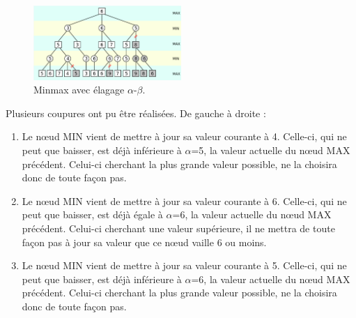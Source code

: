 \begin{figure}[h]
    \begin{center}
        \includegraphics[width=0.5\textwidth]{root/minmax_alpha_beta.png}
    \end{center}
    \caption{Minmax avec élagage $\alpha$-$\beta$.}\label{fig:min_max_alpha_beta}
\end{figure}


Plusieurs coupures ont pu être réalisées. De gauche à droite :
\begin{enumerate}
    \item Le nœud MIN vient de mettre à jour sa valeur courante à 4. Celle-ci, qui ne peut que baisser, est déjà inférieure à $\alpha$=5, 
    la valeur actuelle du nœud MAX précédent. Celui-ci cherchant la plus grande valeur possible, ne la choisira donc de toute façon pas.
    \item Le nœud MIN vient de mettre à jour sa valeur courante à 6. Celle-ci, qui ne peut que baisser, est déjà égale à $\alpha$=6, la valeur 
    actuelle du nœud MAX précédent. Celui-ci cherchant une valeur supérieure, il ne mettra de toute façon pas à jour sa valeur que ce nœud 
    vaille 6 ou moins.
    \item Le nœud MIN vient de mettre à jour sa valeur courante à 5. Celle-ci, qui ne peut que baisser, est déjà inférieure à $\alpha$=6, la valeur 
    actuelle du nœud MAX précédent. Celui-ci cherchant la plus grande valeur possible, ne la choisira donc de toute façon pas.
\end{enumerate}

